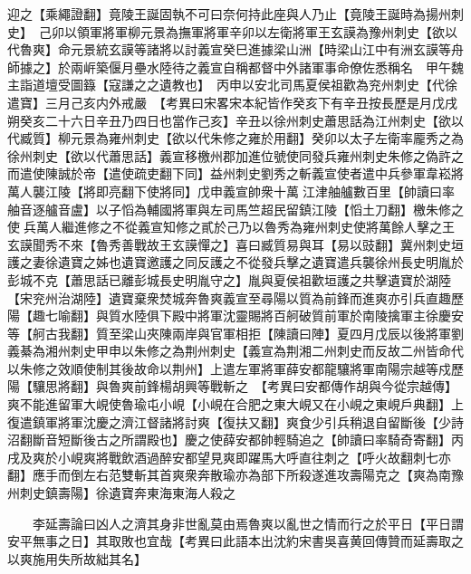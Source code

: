 迎之【乘繩證翻】竟陵王誕固執不可曰奈何持此座與人乃止【竟陵王誕時為揚州刺史】　己卯以領軍將軍柳元景為撫軍將軍辛卯以左衛將軍王玄謨為豫州刺史【欲以代魯爽】命元景統玄謨等諸將以討義宣癸巳進據梁山洲【時梁山江中有洲玄謨等舟師據之】於兩㟁築偃月壘水陸待之義宣自稱都督中外諸軍事命僚佐悉稱名　甲午魏主詣道壇受圖籙【寇謙之之遺教也】　丙申以安北司馬夏侯祖歡為兖州刺史【代徐遣寶】三月己亥内外戒嚴　【考異曰宋畧宋本紀皆作癸亥下有辛丑按長歷是月戊戌朔癸亥二十六日辛丑乃四日也當作己亥】辛丑以徐州刺史蕭思話為江州刺史【欲以代臧質】柳元景為雍州刺史【欲以代朱修之雍於用翻】癸卯以太子左衛率龎秀之為徐州刺史【欲以代蕭思話】義宣移檄州郡加進位號使同發兵雍州刺史朱修之偽許之而遣使陳誠於帝【遣使疏吏翻下同】益州刺史劉秀之斬義宣使者遣中兵參軍韋崧將萬人襲江陵【將即亮翻下使將同】戊申義宣帥衆十萬江津舳艫數百里【帥讀曰率舳音逐艫音盧】以子慆為輔國將軍與左司馬竺超民留鎮江陵【慆土刀翻】檄朱修之使兵萬人繼進修之不從義宣知修之貳於己乃以魯秀為雍州刺史使將萬餘人擊之王玄謨聞秀不來【魯秀善戰故王玄謨憚之】喜曰臧質易與耳【易以豉翻】冀州刺史垣護之妻徐遺寶之姊也遺寶邀護之同反護之不從發兵擊之遺寶遣兵襲徐州長史明胤於彭城不克【蕭思話已離彭城長史明胤守之】胤與夏侯祖歡垣護之共擊遺寶於湖陸【宋兖州治湖陸】遺寶棄衆焚城奔魯爽義宣至尋陽以質為前鋒而進爽亦引兵直趣歷陽【趣七喻翻】與質水陸俱下殿中將軍沈靈賜將百舸破質前軍於南陵擒軍主徐慶安等【舸古我翻】質至梁山夾陳兩岸與官軍相拒【陳讀曰陣】夏四月戊辰以後將軍劉義綦為湘州刺史甲申以朱修之為荆州刺史【義宣為荆湘二州刺史而反故二州皆命代以朱修之效順使制其後故命以荆州】上遣左軍將軍薛安都龍驤將軍南陽宗越等戍歷陽【驤思將翻】與魯爽前鋒楊胡興等戰斬之　【考異曰安都傳作胡與今從宗越傳】爽不能進留軍大峴使魯瑜屯小峴【小峴在合肥之東大峴又在小峴之東峴戶典翻】上復遣鎮軍將軍沈慶之濟江督諸將討爽【復扶又翻】爽食少引兵稍退自留斷後【少詩沼翻斷音短斷後古之所謂殿也】慶之使薛安都帥輕騎追之【帥讀曰率騎奇寄翻】丙戌及爽於小峴爽將戰飲酒過醉安都望見爽即躍馬大呼直往刺之【呼火故翻刺七亦翻】應手而倒左右范雙斬其首爽衆奔散瑜亦為部下所殺遂進攻壽陽克之【爽為南豫州刺史鎮壽陽】徐遺寶奔東海東海人殺之

　　李延壽論曰凶人之濟其身非世亂莫由焉魯爽以亂世之情而行之於平日【平日謂安平無事之日】其取敗也宜哉【考異曰此語本出沈約宋書吳喜黄回傳贊而延壽取之以爽施用失所故絀其名】

